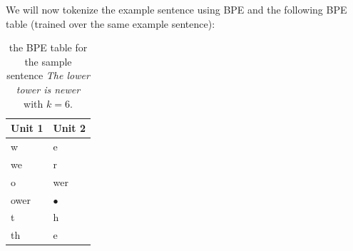 We will now tokenize the example sentence using BPE and the following BPE table (trained over the same example sentence):

\begin{table}[h]
    \centering
    \begin{tabular}{|l|l|}
        \hline
        \textbf{Unit 1} & \textbf{Unit 2} \\
        \hline
        w & e \\
        we & r \\
        o & wer \\
        ower & $\bullet$ \\
        t & h \\
        th & e \\
        \hline
    \end{tabular}
    \caption{the BPE table for the sample sentence \textit{The lower tower is newer} with $k = 6$.}
\end{table}

